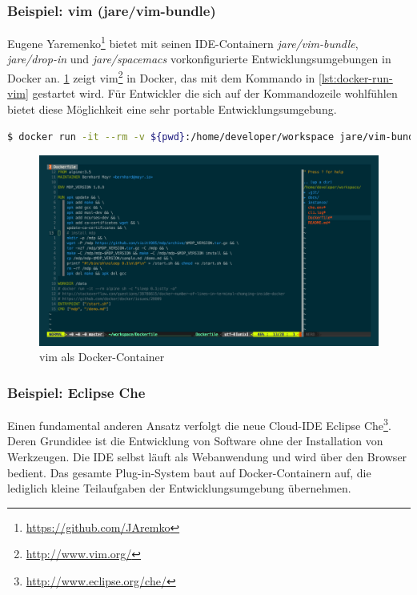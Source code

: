 \subsubsection{Beispiel: vim (jare/vim-bundle)}
Eugene Yaremenko\footnote{\url{https://github.com/JAremko}} bietet mit seinen IDE-Containern \emph{jare/vim-bundle}, \emph{jare/drop-in} und \emph{jare/spacemacs} vorkonfigurierte Entwicklungsumgebungen in Docker an.
\cref{fig:vim-demo} zeigt vim\footnote{\url{http://www.vim.org/}} in Docker, das mit dem Kommando in \cref{lst:docker-run-vim} gestartet wird.
Für Entwickler die sich auf der Kommandozeile wohlfühlen bietet diese Möglichkeit eine sehr portable Entwicklungsumgebung.

\begin{lstlisting}[caption=Docker-Kommando zum Starten von vim, language=bash, label=lst:docker-run-vim]
$ docker run -it --rm -v ${pwd}:/home/developer/workspace jare/vim-bundle
\end{lstlisting}

\begin{figure}[htbp]
    \centering
    \includegraphics[width=0.9\linewidth,clip]{images/vim-demo}
    \caption{vim als Docker-Container}
\label{fig:vim-demo}
\end{figure}

\subsubsection{Beispiel: Eclipse Che}
Einen fundamental anderen Ansatz verfolgt die neue Cloud-IDE Eclipse Che\footnote{\url{http://www.eclipse.org/che/}}.
Deren Grundidee ist die Entwicklung von Software ohne der Installation von Werkzeugen.
Die IDE selbst läuft als Webanwendung und wird über den Browser bedient.
Das gesamte Plug-in-System baut auf Docker-Containern auf, die lediglich kleine Teilaufgaben der Entwicklungsumgebung übernehmen.

